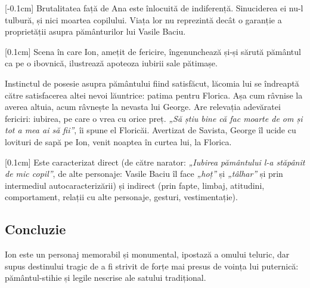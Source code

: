 [-0.1cm]
Brutalitatea față de Ana este înlocuită de indiferență. Sinuciderea ei nu-l tulbură, și nici moartea copilului. Viața lor nu reprezintă decât o garanție a proprietății asupra pământurilor lui Vasile Baciu.

[0.1cm]
Scena în care Ion, amețit de fericire, îngenunchează și-și sărută pământul ca pe o ibovnică, ilustrează apoteoza iubirii sale pătimașe.

Instinctul de posesie asupra pământului fiind satisfăcut, lăcomia lui se îndreaptă către satisfacerea altei nevoi lăuntrice: patima pentru Florica. Așa cum râvnise la averea altuia, acum râvnește la nevasta lui George. Are relevația adevăratei fericiri: iubirea, pe care o vrea cu orice preț. \textit{„Să știu bine că fac moarte de om și tot a mea ai să fii”}, îi spune el Floricăi. Avertizat de Savista, George îl ucide cu lovituri de sapă pe Ion, venit noaptea în curtea lui, la Florica.

[0.1cm]
Este caracterizat direct (de către narator: \textit{„Iubirea pământului l-a stăpânit de mic copil”}, de alte personaje: Vasile Baciu îl face \textit{„hoț”} și \textit{„tâlhar”} și prin intermediul autocaracterizării) și indirect (prin fapte, limbaj, atitudini, comportament, relații cu alte personaje, gesturi, vestimentație).


\subsection{Concluzie}

Ion este un personaj memorabil și monumental, ipostază a omului teluric, dar supus destinului tragic de a fi strivit de forțe mai presus de voința lui puternică: pământul-stihie și legile nescrise ale satului tradițional.
